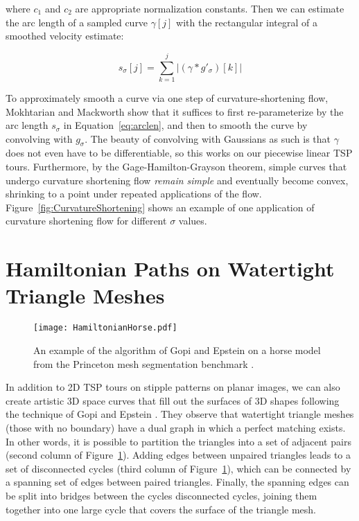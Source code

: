 \documentclass[runningheads]{llncs}
\begin{document}
where $c_1$ and $c_2$ are appropriate normalization constants.  Then we can estimate the arc length of a sampled curve $\gamma[j]$ with the rectangular integral of a smoothed velocity estimate:

\begin{equation}
  \label{eq:arclen}
  s_{\sigma}[j] = \sum_{k=1}^j |(\gamma * g'_{\sigma})[k]|
\end{equation}

To approximately smooth a curve via one step of curvature-shortening flow, Mokhtarian and Mackworth \cite{mokhtarian1992theory} show that it suffices to first re-parameterize by the arc length $s_{\sigma}$ in Equation~\ref{eq:arclen}, and then to smooth the curve by convolving with $g_{\sigma}$.  The beauty of convolving with Gaussians as such is that $\gamma$ does not even have to be differentiable, so this works on our piecewise linear TSP tours.  Furthermore, by the Gage-Hamilton-Grayson theorem, simple curves that undergo curvature shortening flow {\em remain simple} and eventually become convex, shrinking to a point under repeated applications of the flow.  Figure~\ref{fig:CurvatureShortening} shows an example of one application of curvature shortening flow for different $\sigma$ values.



\section{Hamiltonian Paths on Watertight Triangle Meshes}
\label{sec:hamiltonian}

\begin{figure}
  \centering
  \texttt{[image: HamiltonianHorse.pdf]}
  \caption{An example of the algorithm of Gopi and Epstein \cite{gopi2004single} on a horse model from the Princeton mesh segmentation benchmark \cite{Chen:2009:ABF}.}
  \label{fig:HamiltonianHorse}
\end{figure}

In addition to 2D TSP tours on stipple patterns on planar images, we can also create artistic 3D space curves that fill out the surfaces of 3D shapes following the technique of Gopi and Epstein \cite{gopi2004single}.  They observe that watertight triangle meshes (those with no boundary) have a dual graph in which a perfect matching exists.  In other words, it is possible to partition the triangles into a set of adjacent pairs (second column of Figure~\ref{fig:HamiltonianHorse}).  Adding edges between unpaired triangles leads to a set of disconnected cycles (third column of Figure~\ref{fig:HamiltonianHorse}), which can be connected by a spanning set of edges between paired triangles.  Finally, the spanning edges can be split into bridges between the cycles disconnected cycles, joining them together into one large cycle that covers the surface of the triangle mesh.
\end{document}
